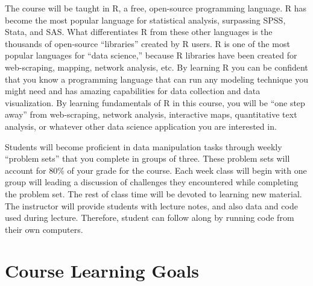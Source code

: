 \documentclass[11pt,]{article}
\begin{document}
The course will be taught in R, a free, open-source programming
language. R has become the most popular language for statistical
analysis, surpassing SPSS, Stata, and SAS. What differentiates R from
these other languages is the thousands of open-source ``libraries''
created by R users. R is one of the most popular languages for ``data
science,'' because R libraries have been created for web-scraping,
mapping, network analysis, etc. By learning R you can be confident that
you know a programming language that can run any modeling technique you
might need and has amazing capabilities for data collection and data
visualization. By learning fundamentals of R in this course, you will be
``one step away'' from web-scraping, network analysis, interactive maps,
quantitative text analysis, or whatever other data science application
you are interested in.

Students will become proficient in data manipulation tasks through
weekly ``problem sets'' that you complete in groups of three. These
problem sets will account for 80\% of your grade for the course. Each
week class will begin with one group will leading a discussion of
challenges they encountered while completing the problem set. The rest
of class time will be devoted to learning new material. The instructor
will provide students with lecture notes, and also data and code used
during lecture. Therefore, student can follow along by running code from
their own computers.

\hypertarget{course-learning-goals}{%
\section{Course Learning Goals}\label{course-learning-goals}}
\end{document}

